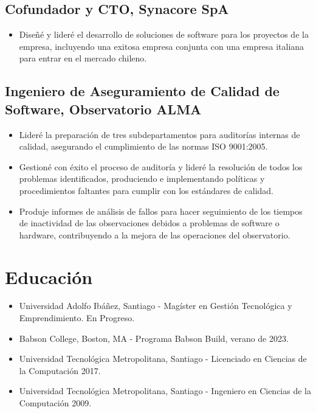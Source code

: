 \documentclass[a4paper,10pt]{article}
\begin{document}
\subsection*{Cofundador y CTO, Synacore SpA}
\begin{itemize}[left=0em]
    \item Diseñé y lideré el desarrollo de soluciones de software para los proyectos de la empresa, incluyendo una exitosa empresa conjunta con una empresa italiana para entrar en el mercado chileno.
\end{itemize}

\subsection*{Ingeniero de Aseguramiento de Calidad de Software, Observatorio ALMA}
\begin{itemize}[left=0em]
    \item Lideré la preparación de tres subdepartamentos para auditorías internas de calidad, asegurando el cumplimiento de las normas ISO 9001:2005.
    \item Gestioné con éxito el proceso de auditoría y lideré la resolución de todos los problemas identificados, produciendo e implementando políticas y procedimientos faltantes para cumplir con los estándares de calidad.
    \item Produje informes de análisis de fallos para hacer seguimiento de los tiempos de inactividad de las observaciones debidos a problemas de software o hardware, contribuyendo a la mejora de las operaciones del observatorio.
\end{itemize}

\section*{Educación}
\begin{itemize}[left=0em]
    \item Universidad Adolfo Ibáñez, Santiago - Magíster en Gestión Tecnológica y Emprendimiento. En Progreso.
    \item Babson College, Boston, MA - Programa Babson Build, verano de 2023.
    \item Universidad Tecnológica Metropolitana, Santiago - Licenciado en Ciencias de la Computación 2017.
    \item Universidad Tecnológica Metropolitana, Santiago - Ingeniero en Ciencias de la Computación 2009.
\end{itemize}
\end{document}
